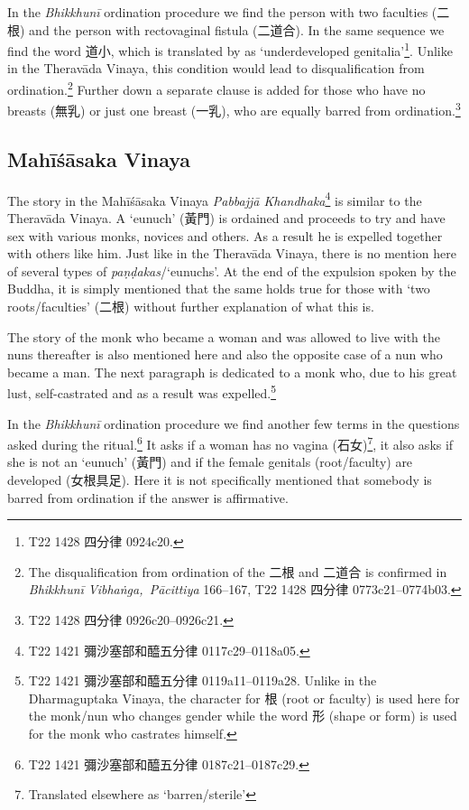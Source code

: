 In the {\em Bhikkhunī} ordination procedure we find the person with two faculties (二根) and the person with rectovaginal fistula (二道合). In the same sequence we find the word 道小, which is translated by \cite{bodhi} as `underdeveloped genitalia'\footnote{T22 1428 四分律 0924c20.}. Unlike in the Theravāda Vinaya, this condition would lead to disqualification from ordination.\footnote{The disqualification from ordination of the 二根 and 二道合 is confirmed in {\em Bhikkhunī Vibhaṅga, Pācittiya} 166–167, T22 1428 四分律 0773c21–0774b03.} Further down a separate clause is added for those who have no breasts (無乳) or just one breast (一乳), who are equally barred from ordination.\footnote{T22 1428 四分律 0926c20–0926c21.}

\subsection{Mahīśāsaka Vinaya}
The story in the Mahīśāsaka Vinaya {\em Pabbajjā Khandhaka}\footnote{T22 1421 彌沙塞部和醯五分律 0117c29–0118a05.} is similar to the Theravāda Vinaya. A `eunuch' (黃門) is ordained and proceeds to try and have sex with various monks, novices and others. As a result he is expelled together with others like him. Just like in the Theravāda Vinaya, there is no mention here of several types of {\em paṇḍakas}/`eunuchs'. At the end of the expulsion spoken by the Buddha, it is simply mentioned that the same holds true for those with `two roots/faculties' (二根) without further explanation of what this is.

The story of the monk who became a woman and was allowed to live with the nuns thereafter is also mentioned here and also the opposite case of a nun who became a man. The next paragraph is dedicated to a monk who, due to his great lust, self-castrated and as a result was expelled.\footnote{T22 1421 彌沙塞部和醯五分律 0119a11–0119a28. Unlike in the Dharmaguptaka Vinaya, the character for 根 (root or faculty) is used here for the monk/nun who changes gender while the word 形 (shape or form) is used for the monk who castrates himself.} 

In the {\em Bhikkhunī} ordination procedure we find another few terms in the questions asked during the ritual.\footnote{T22 1421 彌沙塞部和醯五分律 0187c21–0187c29.} It asks if a woman has no vagina (石女)\footnote{Translated elsewhere as `barren/sterile'}, it also asks if she is not an `eunuch' (黃門) and if the female genitals (root/faculty) are developed (女根具足). Here it is not specifically mentioned that somebody is barred from ordination if the answer is affirmative.

